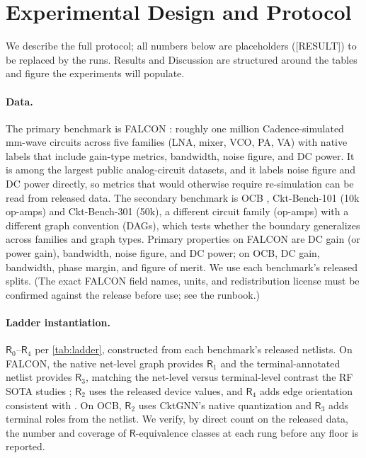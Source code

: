 \documentclass[10pt]{article}
\newcommand{\RES}{{\color{purple}\small[RESULT]}}
\newcommand{\R}{\mathsf{R}}
\begin{document}
\section{Experimental Design and Protocol}
\label{sec:experiments}

We describe the full protocol; all numbers below are placeholders (\RES{}) to be replaced by the runs. Results and Discussion are structured around the tables and figure the experiments will populate.

\paragraph{Data.}
The primary benchmark is FALCON \citep{mehradfar2025falcon}: roughly one million Cadence-simulated mm-wave circuits across five families (LNA, mixer, VCO, PA, VA) with native labels that include gain-type metrics, bandwidth, noise figure, and DC power. It is among the largest public analog-circuit datasets, and it labels noise figure and DC power directly, so metrics that would otherwise require re-simulation can be read from released data. The secondary benchmark is OCB \citep{dong2023cktgnn}, Ckt-Bench-101 (10k op-amps) and Ckt-Bench-301 (50k), a different circuit family (op-amps) with a different graph convention (DAGs), which tests whether the boundary generalizes across families and graph types. Primary properties on FALCON are DC gain (or power gain), bandwidth, noise figure, and DC power; on OCB, DC gain, bandwidth, phase margin, and figure of merit. We use each benchmark's released splits. (The exact FALCON field names, units, and redistribution license must be confirmed against the release before use; see the runbook.)

\paragraph{Ladder instantiation.}
$\R_0$--$\R_4$ per \cref{tab:ladder}, constructed from each benchmark's released netlists. On FALCON, the native net-level graph provides $\R_1$ and the terminal-annotated netlist provides $\R_3$, matching the net-level versus terminal-level contrast the RF SOTA studies \citep{asadi2025rfinformed}; $\R_2$ uses the released device values, and $\R_4$ adds edge orientation consistent with \citep{plettenberg2025flow}. On OCB, $\R_2$ uses CktGNN's native quantization and $\R_3$ adds terminal roles from the netlist. We verify, by direct count on the released data, the number and coverage of $\R$-equivalence classes at each rung before any floor is reported.
\end{document}
